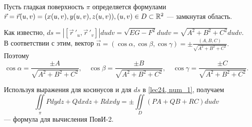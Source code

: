 \documentclass[../../main.tex]{subfiles}
\begin{document}
Пусть гладкая поверхность $\pi$ определяется формулами $\vec{r} = \vec{r}(u,v) 
=
 (x(u,v), y(u,v), z(u,v)), (u, v)\in D\subset \mathbb{R}^2$ --- замкнутая область.

Как известно, $ds = \left|\left[ \vec r\,'_u,  \vec r\,'_v\right]\right|dudv = 
\sqrt{EG - F^2} dudv = \sqrt{A^2 + B^2 + C^2}dudv.$ В соответствии с этим, 
вектор
 $\vec{n} = (\cos\alpha, \cos\beta, \cos\gamma) = \pm\frac{(A, B, C)}{\sqrt{A^2
 		 + B^2 + C^2}}.$ Поэтому \[\cos\alpha = \frac{\pm A}{\sqrt{A^2 + B^2 + 
 		 C^2}},\quad \cos\beta = \frac{\pm B}{\sqrt{A^2 + B^2 + C^2}},\quad 
 	 \cos\gamma = \frac{\pm C}{\sqrt{A^2 + B^2 + C^2}}.\]

Используя выражения для косинусов и для $ds$ в \eqref{lec24, num_1}, получаем
\begin{equation}\label{lec24, num_2}
\iint\limits_\pi Pdydz + Qdxdz + Rdxdy = \pm \iint\limits_D(PA + QB + RC)dudv
\end{equation}
--- формула для вычисления ПовИ-2.
\end{document}
